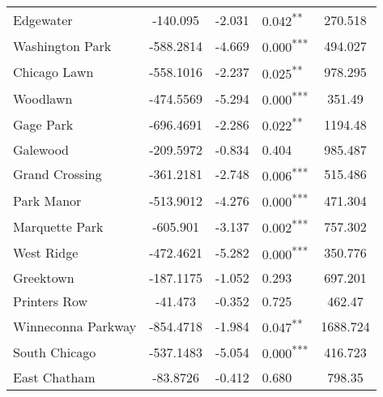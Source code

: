 \documentclass[12pt]{report}
\begin{document}
\begin{longtable}{l S[table-format=6.4] S[table-format=3.4] l S[table-format=4.4]}
	Edgewater                    & -140.095             & -2.031           & 0.042\textsuperscript{**}  & 270.518                           \\
	Washington Park              & -588.2814            & -4.669           & 0.000\textsuperscript{***} & 494.027                           \\
	Chicago Lawn                 & -558.1016            & -2.237           & 0.025\textsuperscript{**}  & 978.295                           \\
	Woodlawn                     & -474.5569            & -5.294           & 0.000\textsuperscript{***} & 351.49                            \\
	Gage Park                    & -696.4691            & -2.286           & 0.022\textsuperscript{**}  & 1194.48                           \\
	Galewood                     & -209.5972            & -0.834           & 0.404                      & 985.487                           \\
	Grand Crossing               & -361.2181            & -2.748           & 0.006\textsuperscript{***} & 515.486                           \\
	Park Manor                   & -513.9012            & -4.276           & 0.000\textsuperscript{***} & 471.304                           \\
	Marquette Park               & -605.901             & -3.137           & 0.002\textsuperscript{***} & 757.302                           \\
	West Ridge                   & -472.4621            & -5.282           & 0.000\textsuperscript{***} & 350.776                           \\
	Greektown                    & -187.1175            & -1.052           & 0.293                      & 697.201                           \\
	Printers Row                 & -41.473              & -0.352           & 0.725                      & 462.47                            \\
	Winneconna Parkway           & -854.4718            & -1.984           & 0.047\textsuperscript{**}  & 1688.724                          \\
	South Chicago                & -537.1483            & -5.054           & 0.000\textsuperscript{***} & 416.723                           \\
	East Chatham                 & -83.8726             & -0.412           & 0.680                      & 798.35                            \\

\end{longtable}
\end{document}
